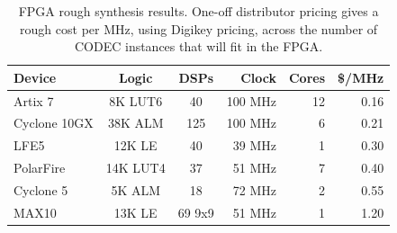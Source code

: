 \begin{table}[t]\centering
	\label{tab:FPGAfit}
	\caption{FPGA rough synthesis results. One-off distributor pricing gives a
	rough cost per MHz, using Digikey pricing, across the number of CODEC
	instances that will fit in the FPGA.}
	\centering
	\begin{tabular}{lccrrr}
		\hline\hline
		Device & Logic & DSPs & Clock & Cores & \$/MHz\\ [0.5ex]
		\hline
        Artix 7     & 8K LUT6 & 40   & 100 MHz & 12 & 0.16\\
		Cyclone 10GX& 38K ALM & 125  & 100 MHz &  6 & 0.21\\
		LFE5        & 12K LE  & 40    & 39 MHz &  1 & 0.30\\
        PolarFire   & 14K LUT4 & 37   & 51 MHz &  7 & 0.40\\
		Cyclone 5   & 5K ALM & 18     & 72 MHz &  2 & 0.55\\
		MAX10       & 13K LE & 69 9x9 & 51 MHz &  1 & 1.20\\
		\hline
	\end{tabular}
\end{table}


